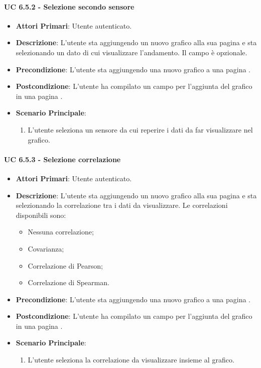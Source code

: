 			\paragraph{UC 6.5.2 - Selezione secondo sensore}
			\begin{itemize}
				\item \textbf{Attori Primari}: Utente autenticato.
				\item \textbf{Descrizione}: L'utente sta aggiungendo un nuovo grafico alla sua pagina  e sta selezionando un dato di cui visualizzare l'andamento. Il campo è opzionale.
				\item \textbf{Precondizione}: L'utente sta aggiungendo una nuovo grafico a una pagina .
				\item \textbf{Postcondizione}: L'utente ha compilato un campo per l'aggiunta del grafico in una pagina .
				\item \textbf{Scenario Principale}:
				\begin{enumerate}
					\item{L'utente seleziona un sensore da cui reperire i dati da far visualizzare nel grafico.}
				\end{enumerate}	
			\end{itemize}

			\paragraph{UC 6.5.3 - Selezione correlazione}
			\begin{itemize}
				\item \textbf{Attori Primari}: Utente autenticato.
				\item \textbf{Descrizione}: L'utente sta aggiungendo un nuovo grafico alla sua pagina  e sta selezionando la correlazione tra i dati da visualizzare. Le correlazioni disponibili sono:
				\begin{itemize}
					\item Nessuna correlazione;
					\item Covarianza;
					\item Correlazione di Pearson;
					\item Correlazione di Spearman.
				\end{itemize}
				\item \textbf{Precondizione}: L'utente sta aggiungendo una nuovo grafico a una pagina .
				\item \textbf{Postcondizione}: L'utente ha compilato un campo per l'aggiunta del grafico in una pagina .
				\item \textbf{Scenario Principale}:
				\begin{enumerate}
					\item{L'utente seleziona la correlazione da visualizzare insieme al grafico.}
				\end{enumerate}	
			\end{itemize}

